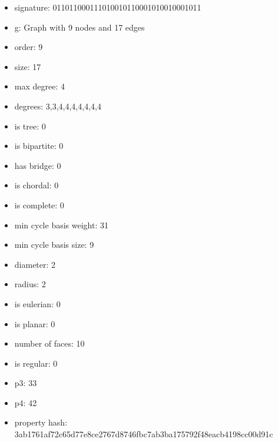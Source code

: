 \newpage
\begin{figure}
\end{figure}
\begin{itemize}
\item signature: 011011000111010010110001010010001011
\item g: Graph with 9 nodes and 17 edges
\item order: 9
\item size: 17
\item max degree: 4
\item degrees: 3,3,4,4,4,4,4,4,4
\item is tree: 0
\item is bipartite: 0
\item has bridge: 0
\item is chordal: 0
\item is complete: 0
\item min cycle basis weight: 31
\item min cycle basis size: 9
\item diameter: 2
\item radius: 2
\item is eulerian: 0
\item is planar: 0
\item number of faces: 10
\item is regular: 0
\item p3: 33
\item p4: 42
\item property hash: 3ab1761af72c65d77e8ce2767d8746fbc7ab3ba175792f48eacb4198cc00d91c
\end{itemize}
